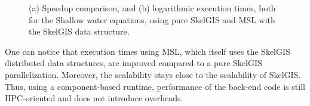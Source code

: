 \begin{figure}
\begin{center}
{}
\hspace{5pt}
\end{center}
\caption{(a) Speedup comparison, and (b) logarithmic execution times, both for the Shallow water equations, using pure SkelGIS and MSL with the SkelGIS data structure.}
\label{fig:perfs}
\end{figure}

One can notice that execution times using MSL, which itself uses the SkelGIS distributed data structures, are improved compared to a pure SkelGIS parallelization. Moreover, the scalability stays close to the scalability of SkelGIS. Thus, using a component-based runtime, performance of the back-end code is still HPC-oriented and does not introduce overheads.

